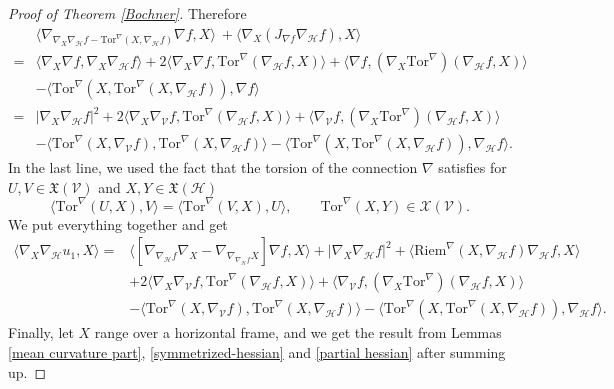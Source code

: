 \documentclass[11pt]{article}
\numberwithin{equation}{section}
\newcommand{\Ho}{\mathcal H}
\newcommand{\V}{\mathcal V}
\newcommand{\Tor}{\mathrm{Tor}}
\begin{document}
\begin{proof}[Proof of Theorem \ref{Bochner}]
		Therefore
		\begin{align*}
			& \langle \nabla_{\nabla_X \nabla_\mathcal{H}f-\Tor^{\nabla}(X, \nabla_\mathcal{H}f) } \nabla f, X \rangle\
			+\langle \nabla_X (J_{\nabla f}\nabla_\mathcal{H}f), X \rangle \\
			=&\langle \nabla_{X} \nabla f, \nabla_X \nabla_\mathcal{H}f  \rangle+2\langle \nabla_X \nabla f, \Tor^\nabla(\nabla_{\mathcal{H}}f, X) \rangle+\langle \nabla f, (\nabla_X \Tor^\nabla)(\nabla_{\mathcal{H}}f, X) \rangle \\
			&-\langle \Tor^\nabla(X, \Tor^{\nabla}(X, \nabla_\mathcal{H}f) ), \nabla f \rangle \\
			=&|\nabla_X \nabla_\mathcal{H}f  |^2+2\langle \nabla_X \nabla_\V f, \Tor^\nabla(\nabla_{\mathcal{H}}f, X) \rangle+\langle \nabla_\V f, (\nabla_X \Tor^\nabla)(\nabla_{\mathcal{H}}f, X) \rangle \\
			&-\langle \Tor^{\nabla}(X, \nabla_\mathcal{V}f) ,\Tor^{\nabla}(X, \nabla_\mathcal{H}f)\rangle-\langle \Tor^\nabla(X, \Tor^{\nabla}(X, \nabla_\mathcal{H}f) ), \nabla_\Ho f \rangle.
		\end{align*}
		In the last line, we used the fact that the torsion of the connection $\nabla$ satisfies for $U,V \in\mathfrak{X}(\V)$ and $X,Y \in \mathfrak{X}(\Ho)$
		\[
		\langle \Tor^\nabla (U,X),V \rangle=\langle \Tor^\nabla (V,X),U \rangle, \qquad \Tor^\nabla (X,Y) \in \mathcal{X}(\V).
		\]
		We put everything together and get		
		\begin{align*}
			\langle \nabla_X \nabla_{\mathcal{H}}u_1 ,X \rangle=&\langle[\nabla_{\nabla_\mathcal{H}f} \nabla_X-\nabla_{\nabla_{\nabla_\mathcal{H}f} X}] \nabla f, X \rangle +|\nabla_X \nabla_\mathcal{H}f  |^2+\langle\mathrm{Riem}^{\nabla}(X, \nabla_{\mathcal{H}} f) \nabla_\Ho f, X\rangle \\
			&+2\langle \nabla_X \nabla_\V f, \Tor^\nabla(\nabla_{\mathcal{H}}f, X) \rangle+\langle \nabla_\V f, (\nabla_X \Tor^\nabla)(\nabla_{\mathcal{H}}f, X) \rangle \\
			& -\langle \Tor^{\nabla}(X, \nabla_\mathcal{V}f) ,\Tor^{\nabla}(X, \nabla_\mathcal{H}f)\rangle-\langle \Tor^\nabla(X, \Tor^{\nabla}(X, \nabla_\mathcal{H}f) ), \nabla_\Ho f \rangle.
		\end{align*}
		Finally, let $X$ range over a horizontal frame, and we get the result  from Lemmas \ref{mean curvature part}, \ref{symmetrized-hessian} and \ref{partial hessian} after summing up. 
        

\end{proof}
\end{document}

